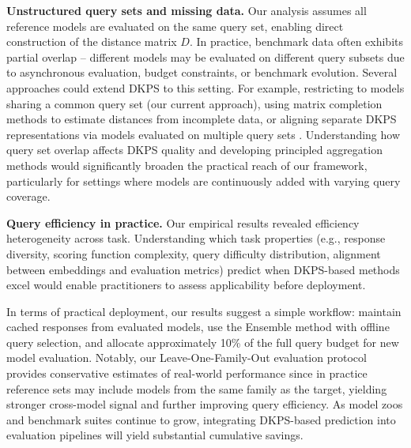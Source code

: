 \noindent\textbf{Unstructured query sets and missing data.}
Our analysis assumes all reference models are evaluated on the same query set, enabling direct construction of the distance matrix $D$.
In practice, benchmark data often exhibits partial overlap -- different models may be evaluated on different query subsets due to asynchronous evaluation, budget constraints, or benchmark evolution. 
Several approaches could extend DKPS to this setting.
For example, restricting to models sharing a common query set (our current approach), using matrix completion methods \citep{candes2008exactmatrixcompletionconvex} to estimate distances from incomplete data, or aligning separate DKPS representations via models evaluated on multiple query sets \citep{priebe2011manifoldmatchingjointoptimization}.
Understanding how query set overlap affects DKPS quality and developing principled aggregation methods would significantly broaden the practical reach of our framework, particularly for settings where models are continuously added with varying query coverage.

\noindent\textbf{Query efficiency in practice.}
Our empirical results revealed efficiency heterogeneity across task.
Understanding which task properties (e.g., response diversity, scoring function complexity, query difficulty distribution, alignment between embeddings and evaluation metrics) predict when DKPS-based methods excel would enable practitioners to assess applicability before deployment.

In terms of practical deployment, our results suggest a simple workflow: maintain cached responses from evaluated models, use the Ensemble method with offline query selection, and allocate approximately 10\% of the full query budget for new model evaluation.
Notably, our Leave-One-Family-Out evaluation protocol provides conservative estimates of real-world performance since in practice reference sets may include models from the same family as the target, yielding stronger cross-model signal and further improving query efficiency.
As model zoos and benchmark suites continue to grow, integrating DKPS-based prediction into evaluation pipelines will yield substantial cumulative savings.